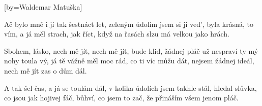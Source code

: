 [by={Waldemar Matuška}]

\beginverse{}
Ač bylo mně i jí tak šestnáct let,  
zeleným údolím jsem si ji ved', 
byla krásná, to vím, a já měl strach, jak říct,
když na řasách slzu má velkou jako hrách.
\endverse{}

\beginchorus{}
Sbohem, lásko, nech mě jít, nech mě jít, bude klid,
žádnej pláč už nespraví ty mý nohy toula vý,
já tě vážně měl moc rád, co ti víc můžu dát,
nejsem žádnej ideál, nech mě jít zas o dům dál.
\endchorus{}

\beginverse{}
A tak šel čas, a já se toulám dál,
v kolika údolích jsem takhle stál,
hledal slůvka, co jsou jak hojivej fáč, bůhví,
co jsem to zač, že přináším všem jenom pláč.
\endverse{}

\beginchorus{}
\phantom{}
\endchorus{}

\endsong{}
